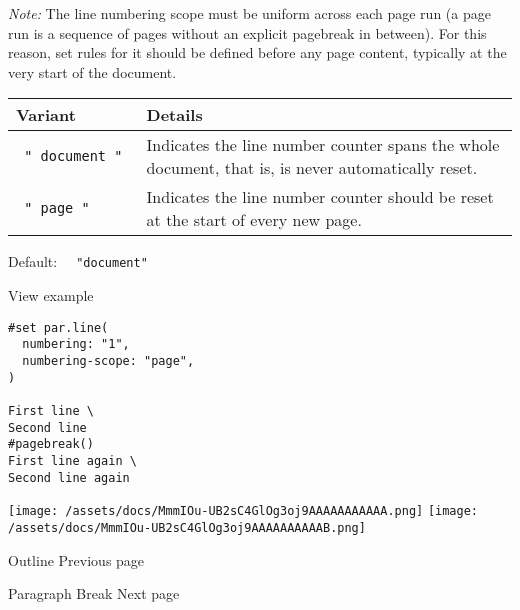\emph{Note:} The line numbering scope must be uniform across each page
run (a page run is a sequence of pages without an explicit pagebreak in
between). For this reason, set rules for it should be defined before any
page content, typically at the very start of the document.

\begin{longtable}[]{@{}ll@{}}
\toprule\noalign{}
Variant & Details \\
\midrule\noalign{}
\endhead
\bottomrule\noalign{}
\endlastfoot
\texttt{\ "\ document\ "\ } & Indicates the line number counter spans
the whole document, that is, is never automatically reset. \\
\texttt{\ "\ page\ "\ } & Indicates the line number counter should be
reset at the start of every new page. \\
\end{longtable}

Default: \texttt{\ }{\texttt{\ "document"\ }}\texttt{\ }


View example

\begin{verbatim}
#set par.line(
  numbering: "1",
  numbering-scope: "page",
)

First line \
Second line
#pagebreak()
First line again \
Second line again
\end{verbatim}

\texttt{[image: /assets/docs/MmmIOu-UB2sC4GlOg3oj9AAAAAAAAAAA.png]}
\texttt{[image: /assets/docs/MmmIOu-UB2sC4GlOg3oj9AAAAAAAAAAB.png]}

\href{/docs/reference/model/outline/}{\pandocbounded{}}

{ Outline } { Previous page }

\href{/docs/reference/model/parbreak/}{\pandocbounded{}}

{ Paragraph Break } { Next page }
